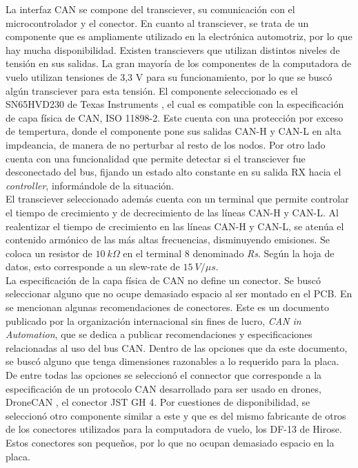 La interfaz CAN se compone del transciever, su comunicación con el microcontrolador y el conector. En cuanto al transciever, se trata de un componente que es ampliamente utilizado en la electrónica automotriz, por lo que hay mucha disponibilidad. Existen transcievers que utilizan distintos niveles de tensión en sus salidas. La gran mayoría de los componentes de la computadora de vuelo utilizan tensiones de 3,3 V para su funcionamiento, por lo que se buscó algún transciever para esta tensión. El componente seleccionado es el SN65HVD230 de Texas Instruments \cite{SN65VHD230}, el cual es compatible con la especificación de capa física de CAN, ISO 11898-2. Este cuenta con una protección por exceso de tempertura, donde el componente pone sus salidas CAN-H y CAN-L en alta impdeancia, de manera de no perturbar al resto de los nodos. Por otro lado cuenta con una funcionalidad que permite detectar si el transciever fue desconectado del bus, fijando un estado alto constante en su salida RX hacia el \textit{controller}, informándole de la situación.\\

El transciever seleccionado además cuenta con un terminal que permite controlar el tiempo de crecimiento y de decrecimiento de las líneas CAN-H y CAN-L. Al realentizar el tiempo de crecimiento en las líneas CAN-H y CAN-L, se atenúa el contenido armónico de las más altas frecuencias, disminuyendo emisiones. Se coloca un resistor de $10 \ k\Omega$ en el terminal 8 denominado \textit{Rs}. Según la hoja de datos, esto corresponde a un slew-rate de $15 \ V / \mu s$.\\

La especificación de la capa física de CAN no define un conector. Se buscó seleccionar alguno que no ocupe demasiado espacio al ser montado en el PCB. En \cite{CiAconnector} se mencionan algunas recomendaciones de conectores. Este es un documento publicado por la organización internacional sin fines de lucro, \textit{CAN in Automation}, que se dedica a publicar recomendaciones y especificaciones relacionadas al uso del bus CAN. Dentro de las opciones que da este documento, se buscó alguno que tenga dimensiones razonables a lo requerido para la placa. De entre todas las opciones se seleccionó el connector que corresponde a la especificación de un protocolo CAN desarrollado para ser usado en drones, DroneCAN \cite{DroneCAN}, el conector JST GH 4. Por cuestiones de disponibilidad, se seleccionó otro componente similar a este y que es del mismo fabricante de otros de los conectores utilizados para la computadora de vuelo, los DF-13 de Hirose. Estos conectores son pequeños, por lo que no ocupan demasiado espacio en la placa.\\

